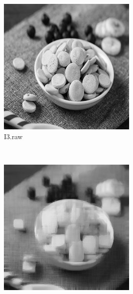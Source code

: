 \documentclass{article}
\begin{document}
\begin{figure}[!htb]
    \centering
    \begin{subfigure}[b]{0.3\textwidth}
        \includegraphics[width=\textwidth]{img/I3.png}
        \caption{I3.raw}
    \end{subfigure}
    ~
    \begin{subfigure}[b]{0.3\textwidth}
        \includegraphics[width=\textwidth]{img/RS.png}

\end{subfigure}
\end{figure}
\end{document}
